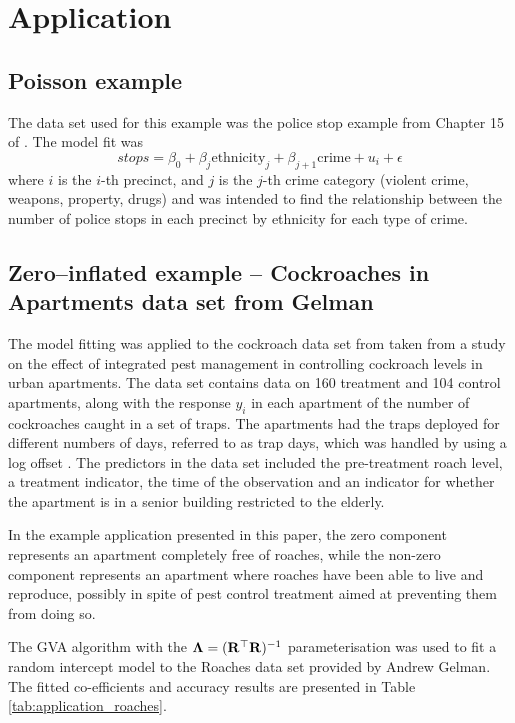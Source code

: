 \documentclass{amsart}[12pt]
\begin{document}
	\section{Application}
	\label{sec:application}

	\subsection{Poisson example}
	The data set used for this example was the police stop example from Chapter 15 of \citep{Gelman2007}.
	The
	model fit was
	\[
		stops = \beta_0 + \beta_j \text{ethnicity}_j + \beta_{j+1} \text{crime} + u_i + \epsilon
	\]
	where $i$ is the $i$-th precinct, and $j$ is the $j$-th crime category (violent crime, weapons, property,
	drugs)
	and was intended to find the relationship between the number of police stops in each precinct by ethnicity
	for each type of crime.

	\subsection{Zero--inflated example -- Cockroaches in Apartments data set from Gelman}
	The model fitting was applied to the cockroach data set from \citep{Gelman2007} taken from a study on the
	effect of integrated pest management in controlling cockroach levels in urban apartments. The data set
	contains data on 160 treatment and 104 control apartments, along with the response $y_i$ in each apartment of
	the number of cockroaches caught in a set of traps. The apartments had the traps deployed for different
	numbers of days, referred to as trap days, which was handled by using a log offset \citep{Agresti2002}. The
	predictors in the data set included the pre-treatment roach level, a treatment indicator, the time of the
	observation and an indicator for whether the apartment is in a senior building restricted to the elderly.
		
	In the example application presented in this paper, the zero component represents an apartment completely free of roaches, while the non-zero component represents an apartment where roaches have been able to live and reproduce, possibly in spite of pest control treatment aimed at preventing them from doing so.
		
	The GVA algorithm with the ${\boldsymbol \Lambda} = ({\bf R}^\top {\bf R})^{-1}$ parameterisation was used to fit a random
	intercept model to the Roaches data set provided by Andrew Gelman. The fitted co-efficients and accuracy
	results are presented in Table \ref{tab:application_roaches}.
		
\end{document}
